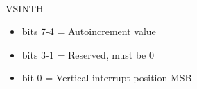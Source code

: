 \\
VSINTH
\begin{itemize}
\item bits 7-4 = Autoincrement value
\item bits 3-1 = Reserved, must be 0
\item bit 0 = Vertical interrupt position MSB
\end{itemize}

